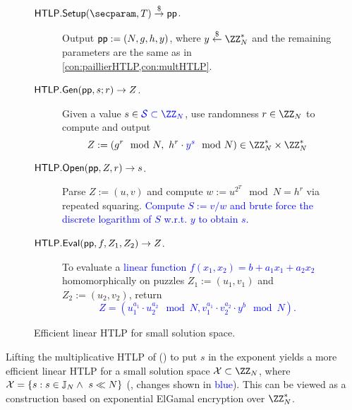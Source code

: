 \renewcommand{\change}[1]{\textcolor{blue}{#1}}
\begin{figure}[tb]
    \centering
    \begin{mdframed}
    \begin{construction}\label{con:exp_elgamalHTLP}
    \hfill
    \begin{description}
        \item[$\htlp.\Setup(\secparam, \Ttime) \randout \pp$.] Output $\mathsf{pp} := (N, g, h, y)$, where $y \sample \ZZ_N^*$ and the remaining parameters are the same as in \cref{con:paillierHTLP,con:multHTLP}.
        \item[$\mathsf{HTLP}.{\sf Gen}(\mathsf{pp}, s; r) \rightarrow Z$.] Given a value $s \in \change{\mathcal{S} \subset \ZZ_N}$, use randomness $r \in \ZZ_{N}$ to compute and output
            $$Z := (g^r \mod{N},\ h^r \cdot \change{y^s} \mod{N}) \in \ZZ_N^* \times \ZZ_N^*$$
        \item[$\mathsf{HTLP}.\mathsf{Open}(\mathsf{pp}, Z, r) \rightarrow s$.] Parse $Z := (u,v)$ and compute $w := u^{2^T} \mod{N} \allowbreak= h^r$ via repeated squaring. \change{Compute $S := v/w$ and brute force the discrete logarithm of $S$ w.r.t. $y$ to obtain $s$.}
        \item[$\mathsf{HTLP}.{\sf Eval}(\mathsf{pp}, f, Z_1, Z_2) \to Z$.] To evaluate a \change{linear function $f(x_1, x_2) = b + a_1 x_1 + a_2 x_2$} homomorphically on puzzles $Z_1 := (u_1, v_1)$ and $Z_2 := (u_2, v_2)$, return
        \change{$$Z = (u_1^{a_1} \cdot u_2^{a_2} \mod{N}, v_1^{a_1} \cdot v_2^{a_2} \cdot y^b \mod{N}).$$}
    \end{description}
    \end{construction}
    \end{mdframed}
    \caption{Efficient linear HTLP for small solution space.}
    \label{fig:exp_elgamalHTLP}
\end{figure}

Lifting the multiplicative HTLP of \cite{C:MalThy19} () to put $s$ in the exponent yields a more efficient linear HTLP for a small solution space $\X \subset \ZZ_N$, where $\mathcal{X} = \{ s : s \in \mathbb{J}_N \land\ s \ll N \}$ (, changes shown in \change{blue}). This can be viewed as a construction based on exponential ElGamal encryption over $\ZZ_N^*$.


